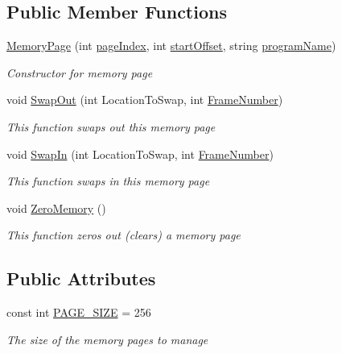 \subsection*{Public Member Functions}
\begin{DoxyCompactItemize}
\item 
\hyperlink{class_c_p_u___o_s___simulator_1_1_memory_1_1_memory_page_afbd62508d7efb21812708338a3ba96e8}{Memory\+Page} (int \hyperlink{class_c_p_u___o_s___simulator_1_1_memory_1_1_memory_page_acf60a7bdefab6120fe080854b5f0b38b}{page\+Index}, int \hyperlink{class_c_p_u___o_s___simulator_1_1_memory_1_1_memory_page_a6fe2e28385db19a1968a41efe3df3f38}{start\+Offset}, string \hyperlink{class_c_p_u___o_s___simulator_1_1_memory_1_1_memory_page_a0607c69f1f03e6c8b63186e0b0f13c3c}{program\+Name})
\begin{DoxyCompactList}\small\item\em Constructor for memory page \end{DoxyCompactList}\item 
void \hyperlink{class_c_p_u___o_s___simulator_1_1_memory_1_1_memory_page_a53d6deee146e06754ea770755b17ff14}{Swap\+Out} (int Location\+To\+Swap, int \hyperlink{class_c_p_u___o_s___simulator_1_1_memory_1_1_memory_page_a89857b70d4065fdc15ce2ea577a7f0ff}{Frame\+Number})
\begin{DoxyCompactList}\small\item\em This function swaps out this memory page \end{DoxyCompactList}\item 
void \hyperlink{class_c_p_u___o_s___simulator_1_1_memory_1_1_memory_page_a79e408c1be5efbaa6969ab66cc46930f}{Swap\+In} (int Location\+To\+Swap, int \hyperlink{class_c_p_u___o_s___simulator_1_1_memory_1_1_memory_page_a89857b70d4065fdc15ce2ea577a7f0ff}{Frame\+Number})
\begin{DoxyCompactList}\small\item\em This function swaps in this memory page \end{DoxyCompactList}\item 
void \hyperlink{class_c_p_u___o_s___simulator_1_1_memory_1_1_memory_page_a0c43cf3b2640f17b8d732acbaaaead96}{Zero\+Memory} ()
\begin{DoxyCompactList}\small\item\em This function zeros out (clears) a memory page \end{DoxyCompactList}\end{DoxyCompactItemize}
\subsection*{Public Attributes}
\begin{DoxyCompactItemize}
\item 
const int \hyperlink{class_c_p_u___o_s___simulator_1_1_memory_1_1_memory_page_a502abee83030136a808d5b5f0c0fe7ec}{P\+A\+G\+E\+\_\+\+S\+I\+Z\+E} = 256
\begin{DoxyCompactList}\small\item\em The size of the memory pages to manage \end{DoxyCompactList}\end{DoxyCompactItemize}
